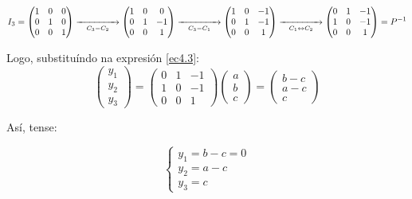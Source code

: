 \documentclass[twoside]{report}
\theoremstyle{mystyle}
\begin{document}
$$
I_{3} = 
\begin{pmatrix}
1 & 0 & 0\\
0 & 1 & 0\\
0 & 0 & 1
\end{pmatrix}
\underset{C_{3} - C_{2}}{\xrightarrow{\hspace{15mm}}}
\begin{pmatrix}
1 & 0 & 0 \\
0 & 1 & -1 \\
0 & 0 & 1
\end{pmatrix}
\underset{C_{3} - C_{1}}{\xrightarrow{\hspace{15mm}}}
\begin{pmatrix}
1 & 0 & -1\\
0 & 1 & -1\\
0 & 0 & 1
\end{pmatrix}
\underset{C_{1} \leftrightarrow C_{2}}{\xrightarrow{\hspace{15mm}}}
\begin{pmatrix}
0 & 1 & -1\\
1 & 0 & -1\\
0 & 0 & 1
\end{pmatrix}
= P^{-1}
$$

\vspace{3mm}

\noindent Logo, substituíndo na expresión \eqref{ec4.3}:\\

$$
\begin{pmatrix}
y_{1} \\ y_{2} \\ y_{3}
\end{pmatrix}
=
\begin{pmatrix}
0 & 1 & -1\\
1 & 0 & -1\\
0 & 0 & 1
\end{pmatrix}
\begin{pmatrix}
a \\ b \\ c
\end{pmatrix}
=
\begin{pmatrix}
b - c \\ a -c \\ c
\end{pmatrix}
$$

\vspace{3mm}

\noindent Así, tense:

$$
\begin{cases}
y_{1} = b - c = 0\\
y_{2} = a - c\\
y_{3} = c
\end{cases}
$$
\end{document}

